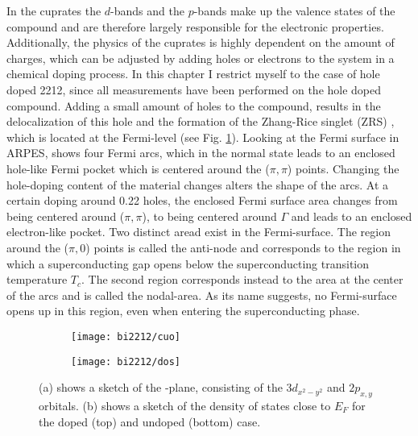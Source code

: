 In the cuprates the  $d$-bands and the  $p$-bands make up the valence states of the compound and are therefore largely responsible for the electronic properties.
Additionally, the physics of the cuprates is highly dependent on the amount of charges, which can be adjusted by adding holes or electrons to the system in a chemical doping process.
In this chapter I restrict myself to the case of hole doped 2212, since all measurements have been performed on the hole doped compound.
Adding a small amount of holes to the compound, results in the delocalization of this hole and the formation of the Zhang-Rice singlet (ZRS) \cite{zhang_effective_1988}, which is located at the Fermi-level (see Fig. \ref{fig:cuo_dos}).
Looking at the Fermi surface in ARPES, shows four Fermi arcs, which in the normal state leads to an enclosed hole-like Fermi pocket which is centered around the ($\pi, \pi$) points.
Changing the hole-doping content of the material changes alters the shape of the arcs.
At a certain doping around 0.22 holes, the enclosed Fermi surface area changes from being centered around ($\pi, \pi$), to being centered around $\Gamma$ and leads to an enclosed electron-like pocket.
Two distinct aread exist in the Fermi-surface.
The region around the ($\pi, 0$) points is called the anti-node and corresponds to the region in which a superconducting gap opens below the superconducting transition temperature $T_c$.
The second region corresponds instead to the area at the center of the arcs and is called the nodal-area.
As its name suggests, no Fermi-surface opens up in this region, even when entering the superconducting phase.

\begin{figure}[t]
	\centering
	\begin{subfigure}[b]{0.49\textwidth}
		\texttt{[image: bi2212/cuo]}
		\caption{}
	\end{subfigure}
	\begin{subfigure}[b]{0.45\textwidth}
		\texttt{[image: bi2212/dos]}
		\caption{}
	\end{subfigure}
	\caption{(a) shows a sketch of the -plane, consisting of the  $3d_{x^2-y^2}$ and  $2p_{x,y}$ orbitals. (b) shows a sketch of the density of states close to $E_F$ for the doped (top) and undoped (bottom) case.}
	\label{fig:cuo_dos}
\end{figure}

